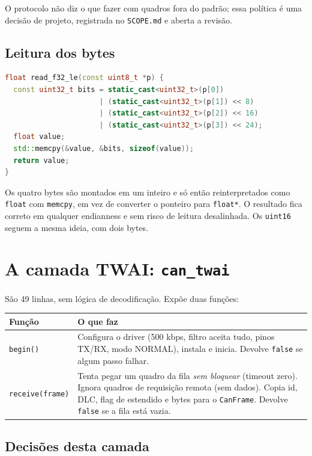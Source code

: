 \documentclass[11pt,a4paper]{article}
\begin{document}
O protocolo não diz o que fazer com quadros fora do padrão; essa política é uma decisão de projeto, registrada no \texttt{SCOPE.md} e aberta a revisão.

\subsection{Leitura dos bytes}

\begin{lstlisting}[language=C++,caption={Leitura de um float little endian}]
float read_f32_le(const uint8_t *p) {
  const uint32_t bits = static_cast<uint32_t>(p[0])
                      | (static_cast<uint32_t>(p[1]) << 8)
                      | (static_cast<uint32_t>(p[2]) << 16)
                      | (static_cast<uint32_t>(p[3]) << 24);
  float value;
  std::memcpy(&value, &bits, sizeof(value));
  return value;
}
\end{lstlisting}

Os quatro bytes são montados em um inteiro e só então reinterpretados como \texttt{float} com \texttt{memcpy}, em vez de converter o ponteiro para \texttt{float*}. O resultado fica correto em qualquer endianness e sem risco de leitura desalinhada. Os \texttt{uint16} seguem a mesma ideia, com dois bytes.

\section{A camada TWAI: \texttt{can\_twai}}

São 49 linhas, sem lógica de decodificação. Expõe duas funções:

\begin{center}
\begin{tabularx}{\textwidth}{lX}
\toprule
\textbf{Função} & \textbf{O que faz} \\
\midrule
\texttt{begin()} & Configura o driver (500 kbps, filtro aceita tudo, pinos TX/RX, modo NORMAL), instala e inicia. Devolve \texttt{false} se algum passo falhar. \\
\texttt{receive(frame)} & Tenta pegar um quadro da fila \emph{sem bloquear} (timeout zero). Ignora quadros de requisição remota (sem dados). Copia id, DLC, flag de estendido e bytes para o \texttt{CanFrame}. Devolve \texttt{false} se a fila está vazia. \\
\bottomrule
\end{tabularx}
\end{center}

\subsection{Decisões desta camada}
\end{document}
